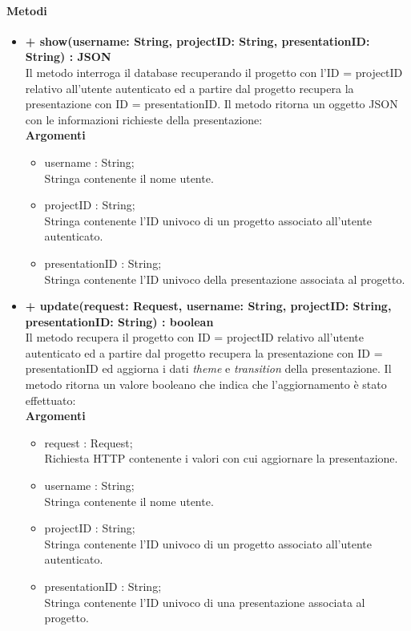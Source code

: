 	\paragraph{Metodi}
		\begin{itemize}
			\item \textbf{+ show(username: String, projectID: String, presentationID: String) : JSON}\\
			Il metodo interroga il database recuperando il progetto con l'ID = projectID relativo all'utente autenticato ed a partire dal progetto recupera la presentazione con ID = presentationID. Il metodo ritorna un oggetto JSON con le informazioni richieste della presentazione:\\
			\textbf{Argomenti}
			\begin{itemize}
				\item username : String; \\
				Stringa contenente il nome utente.
				\item projectID : String; \\
				Stringa contenente l'ID univoco di un progetto associato all'utente autenticato.
				\item presentationID : String; \\
				Stringa contenente l'ID univoco della presentazione associata al progetto.
			\end{itemize}
			
			\item \textbf{+ update(request: Request, username: String, projectID: String, presentationID: String) : boolean}\\
			Il metodo recupera il progetto con ID = projectID relativo all'utente autenticato ed a partire dal progetto recupera la presentazione con ID = presentationID ed aggiorna i dati \textit{theme} e \textit{transition} della presentazione. Il metodo ritorna un valore booleano che indica che l'aggiornamento è stato effettuato:\\
			\textbf{Argomenti}
			\begin{itemize}
				\item request : Request;\\
				Richiesta HTTP contenente i valori con cui aggiornare la presentazione.
				\item username : String; \\
				Stringa contenente il nome utente.
				\item projectID : String; \\
				Stringa contenente l'ID univoco di un progetto associato all'utente autenticato.
				\item presentationID : String; \\
				Stringa contenente l'ID univoco di una presentazione associata al progetto.
			\end{itemize}
			

\end{itemize}
